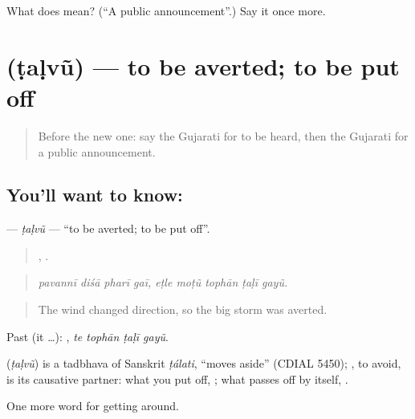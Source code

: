 \begin{tcolorbox}[breakable,colback=teal!4,colframe=teal!35!black,title={Before you move on}]
What does  mean? (\textquotedblleft{}A public announcement\textquotedblright{}.) Say it once more.
\end{tcolorbox}
\section[\texorpdfstring{\gu{ટળવું} (ṭaḷvũ)}{ટળવું (ṭaḷvũ)}]{ (ṭaḷvũ) — to be averted; to be put off}

\label{lesson:GU-C399-talvu}



\begin{quote}
Before the new one: say the Gujarati for to be heard, then the Gujarati for a public announcement.
\end{quote}

\subsection*{You'll want to know: }
\textbf{} — \emph{ṭaḷvũ} — \textquotedblleft{}to be averted; to be put off\textquotedblright{}.

\begin{quote}
   ,     .
\end{quote}

\begin{quote}
\emph{pavannī diśā pharī gaī, eṭle moṭũ tophān ṭaḷī gayũ.}
\end{quote}

\begin{quote}
The wind changed direction, so the big storm was averted.
\end{quote}

Past (it …):    , \emph{te tophān ṭaḷī gayũ}.

\begin{cousinweb}
\textbf{} (\emph{ṭaḷvũ}) is a tadbhava of Sanskrit \emph{ṭálati}, \textquotedblleft{}moves aside\textquotedblright{} (CDIAL 5450); , to avoid, is its causative partner: what you put off, ; what passes off by itself, .
\end{cousinweb}

\begin{grammarlens}[title={What you've built}]
One more word for getting around.
\end{grammarlens}


